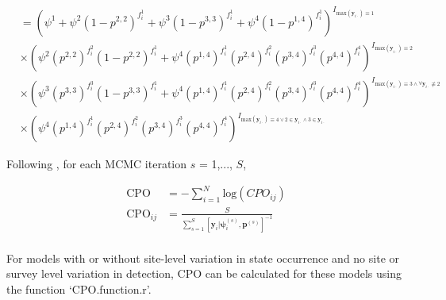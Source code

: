 \documentclass[12pt]{article}
\begin{document}
\begin{center}
\begin{align*}
[\textbf{y}_{i}|\boldsymbol{\psi}_{i}, \boldsymbol{p}]  &= \left(\psi^1+\psi^2(1-p^{2,2})^{f_{i}^1}+ \psi^3(1-p^{3,3})^{f_{i}^1}+\psi^4(1-p^{1,4})^{f_{i}^1}\right)^{I_{\text{max}(\boldsymbol{y}_{i\cdot})\equiv 1}}\\
&\times  \left(\psi^2(p^{2,2})^{f_{i}^2}(1-p^{2,2})^{f_{i}^1}+\psi^4(p^{1,4})^{f_{i}^1}(p^{2,4})^{f_{i}^2}(p^{3,4})^{f_{i}^3}(p^{4,4})^{f_{i}^4}\right)^{I_{\text{max}(\boldsymbol{y}_{i\cdot})\equiv 2}} \\
&\times  \left(\psi^3(p^{3,3})^{f_{i}^3}(1-p^{3,3})^{f_{i}^1}+\psi^4(p^{1,4})^{f_{i}^1}(p^{2,4})^{f_{i}^2}(p^{3,4})^{f_{i}^3}(p^{4,4})^{f_{i}^4}\right)^{I_{\text{max}(\boldsymbol{y}_{i\cdot})\equiv 3 \wedge \forall \boldsymbol{y}_{i\cdot}\not\equiv 2}}\\
&\times  \left(\psi^4(p^{1,4})^{f_{i}^1}(p^{2,4})^{f_{i}^2}(p^{3,4})^{f_{i}^3}(p^{4,4})^{f_{i}^4}\right)^{I_{\text{max}(\boldsymbol{y}_{i\cdot})\equiv 4 \vee 2\in \boldsymbol{y}_{i\cdot}\wedge 3 \in \boldsymbol{y}_{i\cdot}}}
\end{align*}
\end{center}


Following \citealt{broms2016}, for each MCMC iteration $s$ = 1,..., $S$,
\begin{center}
\begin{align*}
\text{CPO}  &=-\sum_{i=1}^{N} \text{log}(CPO_{ij})\\
\text{CPO}_{ij}  &=\frac{S}{\sum_{s=1}^S [\textbf{y}_{i}|\boldsymbol{\psi}_{i}^{(s)}, \boldsymbol{p}^{(s)} ]^{-1}}\\
\end{align*}
\end{center}

For models with or without site-level variation in state occurrence and no site or survey level variation in detection, CPO can be calculated for these models using the function `CPO.function.r'.
\end{document}
